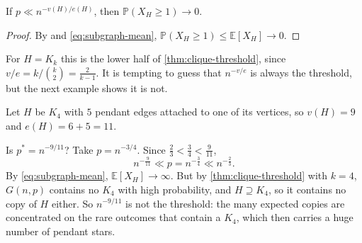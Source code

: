 \begin{proposition}\label{prop:subgraph-sparse}
    If \(p \ll n^{-v(H)/e(H)}\), then \(\mathbb{P}(X_H \ge 1) \to 0\).
\end{proposition}

\begin{proof}
    By  and \eqref{eq:subgraph-mean}, \(\mathbb{P}(X_H \ge 1) \le \mathbb{E}[X_H] \to 0\).
\end{proof}

For \(H = K_k\) this is the lower half of \autoref{thm:clique-threshold}, since \(v/e = k / \binom{k}{2} = \frac{2}{k-1}\). It is tempting to guess that \(n^{-v/e}\) is always the threshold, but the next example shows it is not.

\begin{eg}\label{eg:k4-pendant}
    Let \(H\) be \(K_4\) with \(5\) pendant edges attached to one of its vertices, so \(v(H) = 9\) and \(e(H) = 6 + 5 = 11\).
    \begin{center}
    \end{center}
    Is \(p^{*} = n^{-9/11}\)? Take \(p = n^{-3/4}\). Since \(\frac{2}{3} < \frac{3}{4} < \frac{9}{11}\),
    \[
        n^{-\frac{9}{11}} \ll p = n^{-\frac{3}{4}} \ll n^{-\frac{2}{3}}.
    \]
    By \eqref{eq:subgraph-mean}, \(\mathbb{E}[X_H] \to \infty\). But by \autoref{thm:clique-threshold} with \(k = 4\), \(G(n,p)\) contains no \(K_4\) with high probability, and \(H \supseteq K_4\), so it contains no copy of \(H\) either. So \(n^{-9/11}\) is not the threshold: the many expected copies are concentrated on the rare outcomes that contain a \(K_4\), which then carries a huge number of pendant stars.
\end{eg}

